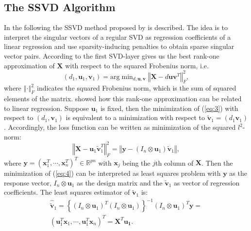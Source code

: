 \subsection{The SSVD Algorithm}
In the following the SSVD method proposed by \cite{Lee2010} is described. The idea is to interpret the singular vectors of a regular SVD as regression coefficients of a linear regression and use sparsity-inducing penalties to obtain sparse singular vector pairs. According to \citet{Eckart1936} the first SVD-layer gives us the best rank-one approximation of $\mathbf{X}$ with respect to the squared Frobenius norm, i.e. 
\begin{equation}
 (d_{1},\mathbf{u}_{1},\mathbf{v}_{1})=\text{arg} \mathop{\mbox{min}}_{d,\mathbf{u},\mathbf{v}} \left\Vert \mathbf{X} - d\mathbf{u}\mathbf{v}^{T} \right\Vert_{F}^{2},
\label{eq:3}
\end{equation}
where $\left\Vert \cdot \right\Vert_{F}^{2}$ indicates the squared Frobenius norm, which is the sum of squared elements of the matrix.
\citet{Lee2010} showed how this rank-one approximation can be related to linear regression. Suppose $\mathbf{u}_1$ is fixed, then the minimization of (\ref{eq:3}) with respect to $(d_{1},\mathbf{v}_{1})$ is equivalent to a minimization with respect to  $\mathbf{\tilde{v}}_{1}=(d_{1}\mathbf{v}_{1})$.
Accordingly, the loss function can be written as minimization of the squared $\textit{l}^{2}$-norm:
\begin{equation}\left\Vert \mathbf{X} - \mathbf{u}_{1}\mathbf{\tilde{v}}_{1}^{T}\right\Vert_{F}^{2}=
\left\Vert \mathbf{y}-(I_{n}\otimes\mathbf{u}_{1})\mathbf{\tilde{v}}_{1}\right\Vert,
\label{eq:4}
\end{equation}
where $\mathbf{y}=(\mathbf{x}_{1}^{T},\cdots,\mathbf{x}_{n}^{T})^T \in \mathbb{R}^{pn}$ with $\mathbf{x}_{j}$ being the $j$th column of $\mathbf{X}$. Then the minimization of (\ref{eq:4}) can be interpreted as least squares problem with $\mathbf{y}$ as the response vector, $I_{n}\otimes\mathbf{u}_{1}$ as the design matrix and the $\mathbf{\tilde{v}}_{1}$ as vector of regression coefficients. The least squares estimator of $\mathbf{\tilde{v}}_{1}$ is: 
\begin{equation}
\begin{split}
\mathbf{\hat{\tilde{v}}}_{1}=
\left\{(I_{n}\otimes\mathbf{u}_{1})^T(I_{n}\otimes\mathbf{u}_{1})\right\}^{-1}(I_{n}\otimes\mathbf{u}_{1})^T\mathbf{y}=\\
(\mathbf{u}_{1}^{T}\mathbf{x}_{1},\cdots,\mathbf{u}_{1}^{T}\mathbf{x}_{n})^{T}=\mathbf{X}^{T}\mathbf{u_{1}}.
\end{split}
\end{equation}
